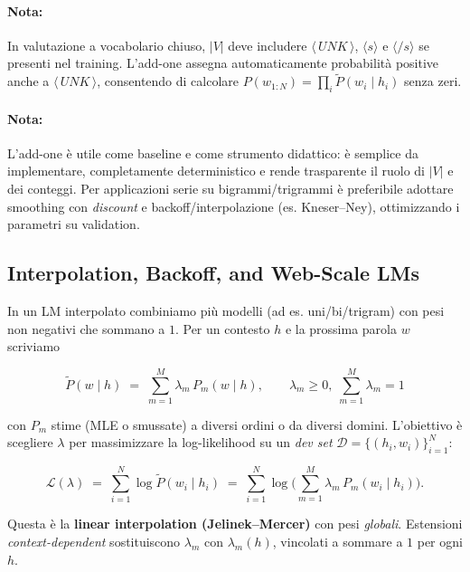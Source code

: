         
        \paragraph{Nota:}
        In valutazione a vocabolario chiuso, $|V|$ deve includere $\langle\,UNK\,\rangle$, $\langle s\rangle$ e $\langle/ s\rangle$ se presenti nel training. L'add-one assegna automaticamente probabilità positive anche a $\langle\,UNK\,\rangle$, consentendo di calcolare $P(w_{1:N})=\prod_i \tilde P(w_i\mid h_i)$ senza zeri.
        
        
        \paragraph{Nota:}
        L'add-one è utile come baseline e come strumento didattico: è semplice da implementare, completamente deterministico e rende trasparente il ruolo di $|V|$ e dei conteggi. Per applicazioni serie su bigrammi/trigrammi è preferibile adottare smoothing con \textit{discount} e backoff/interpolazione (es. Kneser--Ney), ottimizzando i parametri su validation.

    \newpage

    \subsection{Interpolation, Backoff, and Web-Scale LMs}
    
        In un LM interpolato combiniamo più modelli (ad es. uni/bi/trigram) con pesi non negativi che sommano a $1$. Per un contesto $h$ e la prossima parola $w$ scriviamo
        
        $$
        \tilde P(w\mid h) \;=\; \sum_{m=1}^{M} \lambda_m\, P_m(w\mid h),\qquad \lambda_m\ge 0,\; \sum_{m=1}^M \lambda_m=1
        $$
        
        con $P_m$ stime (MLE o smussate) a diversi ordini o da diversi domini. L'obiettivo è scegliere $\lambda$ per massimizzare la log-likelihood su un \textit{dev set} $\mathcal{D}=\{(h_i,w_i)\}_{i=1}^N$:
        
        $$
        \mathcal{L}(\lambda) \;=\; \sum_{i=1}^{N} \log \tilde P(w_i\mid h_i)
        \;=\; \sum_{i=1}^{N} \log \Big( \sum_{m=1}^{M} \lambda_m\, P_m(w_i\mid h_i) \Big).
        $$
        
        Questa è la \textbf{linear interpolation (Jelinek--Mercer)} con pesi \textit{globali}. Estensioni \textit{context-dependent} sostituiscono $\lambda_m$ con $\lambda_m(h)$, vincolati a sommare a $1$ per ogni $h$.

